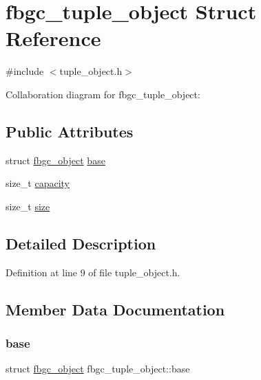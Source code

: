 \hypertarget{structfbgc__tuple__object}{}\section{fbgc\+\_\+tuple\+\_\+object Struct Reference}
\label{structfbgc__tuple__object}


{\ttfamily \#include $<$tuple\+\_\+object.\+h$>$}



Collaboration diagram for fbgc\+\_\+tuple\+\_\+object\+:
\subsection*{Public Attributes}
\begin{DoxyCompactItemize}
\item 
struct \hyperlink{structfbgc__object}{fbgc\+\_\+object} \hyperlink{structfbgc__tuple__object_a3ea3c5e7f8102e8b0bda00e0931e5fe8}{base}
\item 
size\+\_\+t \hyperlink{structfbgc__tuple__object_a216ec53e33e224f0c2aa1b0e0b7ed714}{capacity}
\item 
size\+\_\+t \hyperlink{structfbgc__tuple__object_af01be64362503bcfe1d7e9c3fc779723}{size}
\end{DoxyCompactItemize}


\subsection{Detailed Description}


Definition at line 9 of file tuple\+\_\+object.\+h.



\subsection{Member Data Documentation}
\mbox{\label{structfbgc__tuple__object_a3ea3c5e7f8102e8b0bda00e0931e5fe8}} 
\subsubsection{\texorpdfstring{base}{base}}
{\footnotesize\ttfamily struct \hyperlink{structfbgc__object}{fbgc\+\_\+object} fbgc\+\_\+tuple\+\_\+object\+::base}



